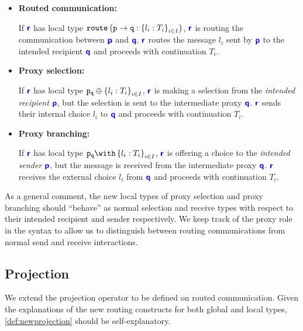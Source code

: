 \begin{itemize}

\item \textbf{Routed communication:}

If ${\color{blue}\bm{\mathsf{r}}}$ has local type $\texttt{route}\left({\mathtt{p}} \to {\mathtt{q}}: \left\{{l_i: T_i}\right\}_{i \in I}\right)$,
${\color{blue}\bm{\mathsf{r}}}$ is routing the communication between 
${\color{blue}\bm{\mathsf{p}}}$ and ${\color{blue}\bm{\mathsf{q}}}$.
${\color{blue}\bm{\mathsf{r}}}$ routes the message $l_i$ sent by ${\color{blue}\bm{\mathsf{p}}}$
to the intended recipient ${\color{blue}\bm{\mathsf{q}}}$ and proceeds 
with continuation $T_i$.

\item \textbf{Proxy selection:}

If ${\color{blue}\bm{\mathsf{r}}}$ has local type ${\mathtt{{\mathtt{p}}_{{\mathtt{q}}}}} \oplus \left\{ {l_i: T_i} \right\}_{i \in I}$,
${\color{blue}\bm{\mathsf{r}}}$ is making a selection from the
\textit{intended recipient} ${\color{blue}\bm{\mathsf{p}}}$,
but the selection is sent to the intermediate proxy ${\color{blue}\bm{\mathsf{q}}}$. 
${\color{blue}\bm{\mathsf{r}}}$ sends their internal choice $l_i$ to ${\color{blue}\bm{\mathsf{q}}}$
and proceeds with continuation $T_i$.

\item \textbf{Proxy branching:}

If ${\color{blue}\bm{\mathsf{r}}}$ has local type $\tbraproxy{p}{q}{l_i: T_i}{i \in I}$,
${\color{blue}\bm{\mathsf{r}}}$ is offering a choice to the
\textit{intended sender} ${\color{blue}\bm{\mathsf{p}}}$,
but the message is received from the intermediate proxy ${\color{blue}\bm{\mathsf{q}}}$.
${\color{blue}\bm{\mathsf{r}}}$ receives the external choice $l_i$ from ${\color{blue}\bm{\mathsf{q}}}$
and proceeds with continuation $T_i$.

\end{itemize}

As a general comment, the new local types of proxy selection
and proxy branching should ``behave'' as normal selection and
receive types with respect to their intended recipient and sender
respectively. We keep track of the proxy role in the syntax
to allow us to distinguish between routing communications
from normal send and receive interactions.

\subsection{Projection}
\label{subsection:newprojection}

We extend the projection operator to be defined
on routed communication. Given the explanations of the
new routing constructs for both global and local types,
\cref{def:newprojection} should be self-explanatory.

